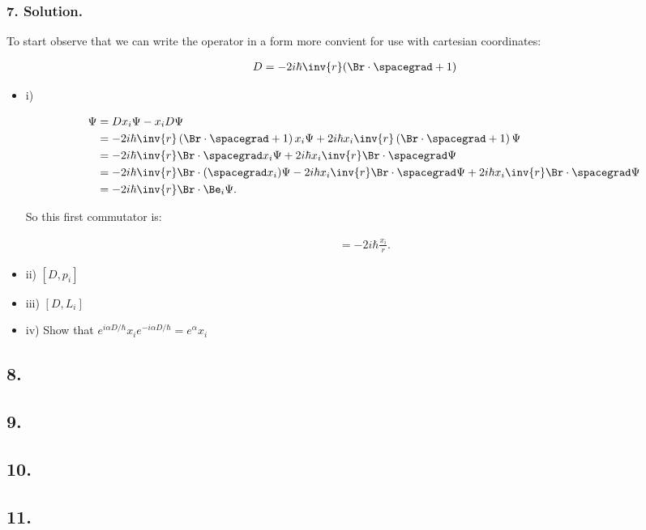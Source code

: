 \subsubsection{7. Solution.}

To start observe that we can write the operator in a form more convient for use with cartesian coordinates:

\begin{align*}
D = -2 i\hbar \inv{r}( \Br \cdot \spacegrad + 1)
\end{align*}

\begin{itemize}
\item i) 

\begin{align*}
[D, x_i] \Psi
&=
D x_i \Psi - x_i D \Psi \\
&=
-2 i \hbar \inv{r} \left( \Br \cdot \spacegrad + 1 \right) x_i \Psi
+2 i \hbar x_i \inv{r} \left( \Br \cdot \spacegrad + 1 \right) \Psi \\
&=
-2 i \hbar \inv{r} \Br \cdot \spacegrad x_i \Psi
+2 i \hbar x_i \inv{r} \Br \cdot \spacegrad \Psi \\
&=
-2 i \hbar \inv{r} \Br \cdot (\spacegrad x_i) \Psi
-2 i \hbar x_i \inv{r} \Br \cdot \spacegrad \Psi
+2 i \hbar x_i \inv{r} \Br \cdot \spacegrad \Psi \\
&=
-2 i \hbar \inv{r} \Br \cdot \Be_i \Psi.
\end{align*}

So this first commutator is:

\begin{align*}
[D, x_i] = -2 i \hbar \frac{x_i}{r}.
\end{align*}

\item ii) $[D, p_i]$
\item iii) $[D, L_i]$

\item iv) Show that $e^{i\alpha D/\hbar} x_i e^{-i\alpha D/\hbar} = e^\alpha x_i$
\end{itemize}

\subsection{8.}
\subsection{9.}
\subsection{10.}
\subsection{11.}

\EndArticle
